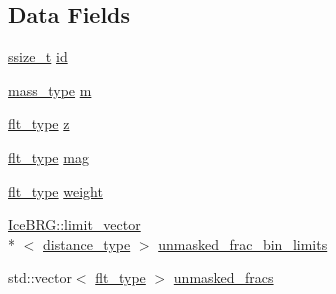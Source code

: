 \subsection*{Data Fields}
\begin{DoxyCompactItemize}
\item 
\hyperlink{lib_2IceBRG__main_2common_8h_ab322a3e50421dc5f0c43316b1b373592}{ssize\-\_\-t} \hyperlink{structIceBRG_1_1lens__id_afd7ce5f12f3675c0c63e2b741c177652}{id}
\item 
\hyperlink{namespaceIceBRG_a1be72ac4918a9b029f2eefa084213e35}{mass\-\_\-type} \hyperlink{structIceBRG_1_1lens__id_af2551e9da4443bc56540c32dee75fbb5}{m}
\item 
\hyperlink{lib_2IceBRG__main_2common_8h_ad0f130a56eeb944d9ef2692ee881ecc4}{flt\-\_\-type} \hyperlink{structIceBRG_1_1lens__id_aedfbb8478463687a0aa5982105a9f8fc}{z}
\item 
\hyperlink{lib_2IceBRG__main_2common_8h_ad0f130a56eeb944d9ef2692ee881ecc4}{flt\-\_\-type} \hyperlink{structIceBRG_1_1lens__id_a9685ba64aac6b662881132968034d32a}{mag}
\item 
\hyperlink{lib_2IceBRG__main_2common_8h_ad0f130a56eeb944d9ef2692ee881ecc4}{flt\-\_\-type} \hyperlink{structIceBRG_1_1lens__id_ab1474c2d0c19469e6bb8c333b2123586}{weight}
\item 
\hyperlink{classIceBRG_1_1limit__vector}{Ice\-B\-R\-G\-::limit\-\_\-vector}\\*
$<$ \hyperlink{namespaceIceBRG_a45499647eb87e24c10ab32c628711cec}{distance\-\_\-type} $>$ \hyperlink{structIceBRG_1_1lens__id_a6a4f65e3e6e010a6d3ad0e27ba84ad9b}{unmasked\-\_\-frac\-\_\-bin\-\_\-limits}
\item 
std\-::vector$<$ \hyperlink{lib_2IceBRG__main_2common_8h_ad0f130a56eeb944d9ef2692ee881ecc4}{flt\-\_\-type} $>$ \hyperlink{structIceBRG_1_1lens__id_a9a3d312cb37f480aa07d94e5a39d714b}{unmasked\-\_\-fracs}
\end{DoxyCompactItemize}


